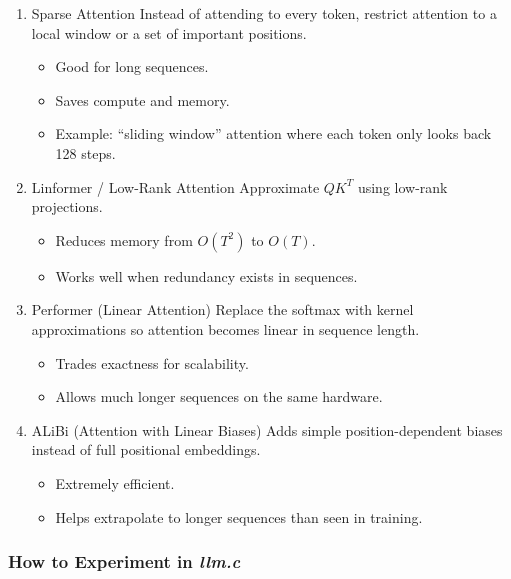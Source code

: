 \documentclass[
  letterpaper,
  DIV=11,
  numbers=noendperiod]{scrreprt}
\providecommand{\tightlist}{%
  \setlength{\itemsep}{0pt}\setlength{\parskip}{0pt}}
\begin{document}
\begin{enumerate}
\def\labelenumi{\arabic{enumi}.}
\item
  Sparse Attention Instead of attending to every token, restrict
  attention to a local window or a set of important positions.

  \begin{itemize}
  \tightlist
  \item
    Good for long sequences.
  \item
    Saves compute and memory.
  \item
    Example: ``sliding window'' attention where each token only looks
    back 128 steps.
  \end{itemize}
\item
  Linformer / Low-Rank Attention Approximate \(QK^T\) using low-rank
  projections.

  \begin{itemize}
  \tightlist
  \item
    Reduces memory from \(O(T^2)\) to \(O(T)\).
  \item
    Works well when redundancy exists in sequences.
  \end{itemize}
\item
  Performer (Linear Attention) Replace the softmax with kernel
  approximations so attention becomes linear in sequence length.

  \begin{itemize}
  \tightlist
  \item
    Trades exactness for scalability.
  \item
    Allows much longer sequences on the same hardware.
  \end{itemize}
\item
  ALiBi (Attention with Linear Biases) Adds simple position-dependent
  biases instead of full positional embeddings.

  \begin{itemize}
  \tightlist
  \item
    Extremely efficient.
  \item
    Helps extrapolate to longer sequences than seen in training.
  \end{itemize}
\end{enumerate}

\subsubsection{\texorpdfstring{How to Experiment in
\emph{llm.c}}{How to Experiment in llm.c}}\label{how-to-experiment-in-llm.c}
\end{document}
